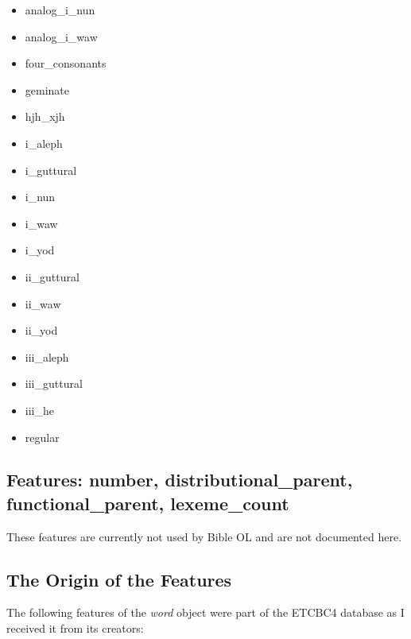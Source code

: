 \documentclass[11pt,oneside,a4paper]{memoir}
\begin{document}
\begin{itemize}
\item analog\_i\_nun
\item analog\_i\_waw
\item four\_consonants
\item geminate
\item hjh\_xjh
\item i\_aleph
\item i\_guttural
\item i\_nun
\item i\_waw
\item i\_yod
\item ii\_guttural
\item ii\_waw
\item ii\_yod
\item iii\_aleph
\item iii\_guttural
\item iii\_he
\item regular
\end{itemize}

\subsection{Features: number, distributional\_parent, functional\_parent, lexeme\_count}

These features are currently not used by Bible OL and are not documented here.

\subsection{The Origin of the Features}\label{etcbc-origin}

The following features of the \emph{word} object were part of the ETCBC4 database as I received it
from its creators:
\end{document}
